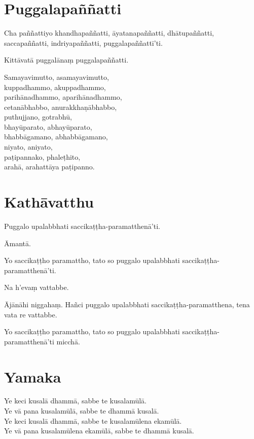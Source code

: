 \section{Puggalapaññatti}

Cha paññattiyo khandhapaññatti, āyatanapaññatti, dhātupaññatti, saccapaññatti,
indriyapaññatti, puggalapaññattī'ti.

Kittāvatā puggalānaṃ puggalapaññatti.

Samayavimutto, asamayavimutto,\\
kuppadhammo, akuppadhammo,\\
parihānadhammo, aparihānadhammo,\\
cetanābhabbo, anurakkhaṇābhabbo,\\
puthujjano, gotrabhū,\\
bhayūparato, abhayūparato,\\
bhabbāgamano, abhabbāgamano,\\
niyato, aniyato,\\
paṭipannako, phaleṭhito,\\
arahā, arahattāya paṭipanno.



\section{Kathāvatthu}

Puggalo upalabbhati saccikaṭṭha-paramatthenā'ti.

Āmantā.

Yo saccikaṭṭho paramattho, tato so puggalo upalabbhati
saccikaṭṭha-paramatthenā'ti.

Na h’evaṃ vattabbe.

Ājānāhi niggahaṃ. Hañci puggalo upalabbhati
saccikaṭṭha-paramatthena, tena vata re vattabbe.

Yo saccikaṭṭho paramattho, tato so puggalo upalabbhati
saccikaṭṭha-paramatthenā'ti micchā.



\section{Yamaka}

Ye keci kusalā dhammā, sabbe te kusalamūlā.\\ 
Ye vā pana kusalamūlā, sabbe te dhammā kusalā.\\
Ye keci kusalā dhammā, sabbe te kusalamūlena ekamūlā.\\ 
Ye vā pana kusalamūlena ekamūlā, sabbe te dhammā kusalā.


